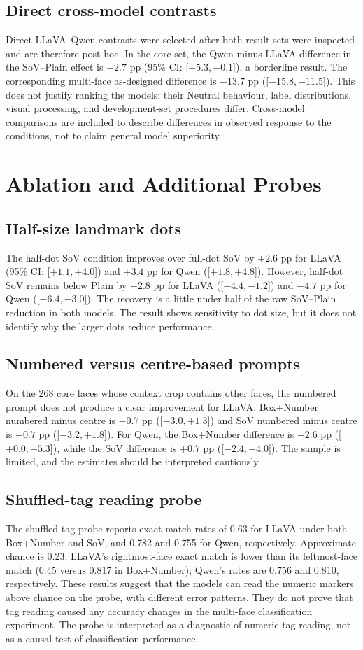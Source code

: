 \documentclass[lettersize,journal]{IEEEtran}
\begin{document}
\subsection{Direct cross-model contrasts}
Direct LLaVA--Qwen contrasts were selected after both result sets were inspected and are therefore post hoc. In the core set, the Qwen-minus-LLaVA difference in the SoV--Plain effect is $-2.7$ pp (95\% CI: [$-5.3,-0.1$]), a borderline result. The corresponding multi-face as-designed difference is $-13.7$ pp ([$-15.8,-11.5$]). This does not justify ranking the models: their Neutral behaviour, label distributions, visual processing, and development-set procedures differ. Cross-model comparisons are included to describe differences in observed response to the conditions, not to claim general model superiority.

\section{Ablation and Additional Probes}
\subsection{Half-size landmark dots}
The half-dot SoV condition improves over full-dot SoV by $+2.6$ pp for LLaVA (95\% CI: [$+1.1,+4.0$]) and $+3.4$ pp for Qwen ([$+1.8,+4.8$]). However, half-dot SoV remains below Plain by $-2.8$ pp for LLaVA ([$-4.4,-1.2$]) and $-4.7$ pp for Qwen ([$-6.4,-3.0$]). The recovery is a little under half of the raw SoV--Plain reduction in both models. The result shows sensitivity to dot size, but it does not identify why the larger dots reduce performance.

\subsection{Numbered versus centre-based prompts}
On the 268 core faces whose context crop contains other faces, the numbered prompt does not produce a clear improvement for LLaVA: Box+Number numbered minus centre is $-0.7$ pp ([$-3.0,+1.3$]) and SoV numbered minus centre is $-0.7$ pp ([$-3.2,+1.8$]). For Qwen, the Box+Number difference is $+2.6$ pp ([$+0.0,+5.3$]), while the SoV difference is $+0.7$ pp ([$-2.4,+4.0$]). The sample is limited, and the estimates should be interpreted cautiously.

\subsection{Shuffled-tag reading probe}
The shuffled-tag probe reports exact-match rates of 0.63 for LLaVA under both Box+Number and SoV, and 0.782 and 0.755 for Qwen, respectively. Approximate chance is 0.23. LLaVA's rightmost-face exact match is lower than its leftmost-face match (0.45 versus 0.817 in Box+Number); Qwen's rates are 0.756 and 0.810, respectively. These results suggest that the models can read the numeric markers above chance on the probe, with different error patterns. They do not prove that tag reading caused any accuracy changes in the multi-face classification experiment. The probe is interpreted as a diagnostic of numeric-tag reading, not as a causal test of classification performance.
\end{document}
